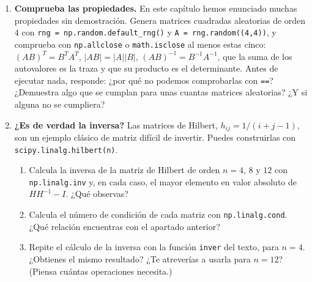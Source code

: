 \begin{enumerate}
\begin{verbatim}
def producto(X, Y):
    n, m = X.shape
    m2, l = Y.shape
    P = np.zeros((n, l))
    for i in range(n):
        for j in range(l):
            for k in range(n):
                P[i, j] = P[i, j] + X[i, k]*Y[k, j]
    return P
\end{verbatim}
\begin{enumerate}
\item Pruébala con $X$ de orden $2\times 3$ e $Y$ de orden $3\times 2$, y después con $Y$ por $X$. ¿Qué ocurre en cada caso?
\item Encuentra el error y corrígelo.
\item ¿Por qué no lo detectaron sus autores? ¿Qué casos de prueba deberían haber usado? Escribe tres comprobaciones con \texttt{assert} y \texttt{np.allclose} que lo habrían detectado.
\end{enumerate}

\item \textbf{Comprueba las propiedades.} En este capítulo hemos enunciado muchas propiedades sin demostración. Genera matrices cuadradas aleatorias de orden $4$ con \texttt{rng = np.random.default_rng()} y \texttt{A = rng.random((4,4))}, y comprueba con \texttt{np.allclose} o \texttt{math.isclose} al menos estas cinco: $(AB)^T=B^TA^T$, $\vert AB\vert=\vert A\vert \vert B\vert$, $(AB)^{-1}=B^{-1}A^{-1}$, que la suma de los autovalores es la traza y que su producto es el determinante. Antes de ejecutar nada, responde: ¿por qué no podemos comprobarlas con \texttt{==}? ¿Demuestra algo que se cumplan para unas cuantas matrices aleatorias? ¿Y si alguna no se cumpliera?

\item \textbf{¿Es de verdad la inversa?} Las matrices de Hilbert, $h_{ij}=1/(i+j-1)$, son un ejemplo clásico de matriz difícil de invertir. Puedes construirlas con \texttt{scipy.linalg.hilbert(n)}.
\begin{enumerate}
\item Calcula la inversa de la matriz de Hilbert de orden $n=4$, $8$ y $12$ con \texttt{np.linalg.inv} y, en cada caso, el mayor elemento en valor absoluto de $HH^{-1}-I$. ¿Qué observas?
\item Calcula el número de condición de cada matriz con \texttt{np.linalg.cond}. ¿Qué relación encuentras con el apartado anterior?
\item Repite el cálculo de la inversa con la función \texttt{inver} del texto, para $n=4$. ¿Obtienes el mismo resultado? ¿Te atreverías a usarla para $n=12$? (Piensa cuántas operaciones necesita.)
\end{enumerate}


\end{enumerate}
